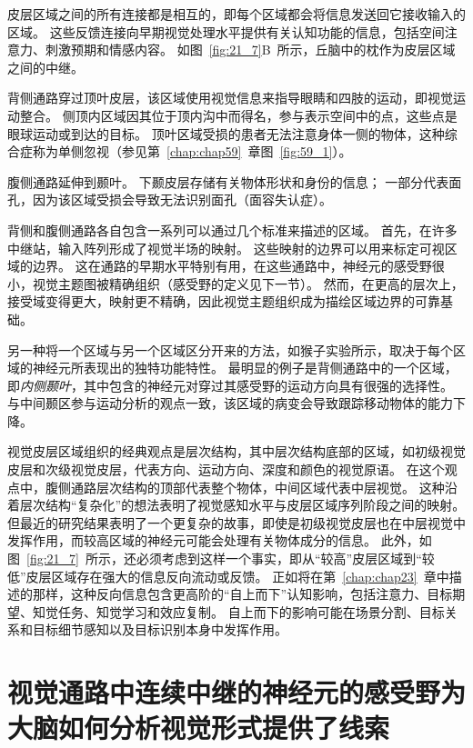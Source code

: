皮层区域之间的所有连接都是相互的，即每个区域都会将信息发送回它接收输入的区域。
这些反馈连接向早期视觉处理水平提供有关认知功能的信息，包括空间注意力、刺激预期和情感内容。
如图~\ref{fig:21_7}B~所示，丘脑中的枕作为皮层区域之间的中继。


背侧通路穿过顶叶皮层，该区域使用视觉信息来指导眼睛和四肢的运动，即视觉运动整合。
侧顶内区域因其位于顶内沟中而得名，参与表示空间中的点，这些点是眼球运动或到达的目标。
顶叶区域受损的患者无法注意身体一侧的物体，这种综合症称为单侧忽视（参见第~\ref{chap:chap59}~章图~\ref{fig:59_1}）。


腹侧通路延伸到颞叶。
下颞皮层存储有关物体形状和身份的信息；
一部分代表面孔，因为该区域受损会导致无法识别面孔（面容失认症）。


背侧和腹侧通路各自包含一系列可以通过几个标准来描述的区域。
首先，在许多中继站，输入阵列形成了视觉半场的映射。
这些映射的边界可以用来标定可视区域的边界。
这在通路的早期水平特别有用，在这些通路中，神经元的感受野很小，视觉主题图被精确组织（感受野的定义见下一节）。
然而，在更高的层次上，接受域变得更大，映射更不精确，因此视觉主题组织成为描绘区域边界的可靠基础。


另一种将一个区域与另一个区域区分开来的方法，如猴子实验所示，取决于每个区域的神经元所表现出的独特功能特性。
最明显的例子是背侧通路中的一个区域，即\textit{内侧颞叶}，其中包含的神经元对穿过其感受野的运动方向具有很强的选择性。
与中间颞区参与运动分析的观点一致，该区域的病变会导致跟踪移动物体的能力下降。


视觉皮层区域组织的经典观点是层次结构，其中层次结构底部的区域，如初级视觉皮层和次级视觉皮层，代表方向、运动方向、深度和颜色的视觉原语。
在这个观点中，腹侧通路层次结构的顶部代表整个物体，中间区域代表中层视觉。
这种沿着层次结构“复杂化”的想法表明了视觉感知水平与皮层区域序列阶段之间的映射。
但最近的研究结果表明了一个更复杂的故事，即使是初级视觉皮层也在中层视觉中发挥作用，而较高区域的神经元可能会处理有关物体成分的信息。
此外，如图~\ref{fig:21_7}~所示，还必须考虑到这样一个事实，即从“较高”皮层区域到“较低”皮层区域存在强大的信息反向流动或反馈。
正如将在第~\ref{chap:chap23}~章中描述的那样，这种反向信息包含更高阶的“自上而下”认知影响，包括注意力、目标期望、知觉任务、知觉学习和效应复制。
自上而下的影响可能在场景分割、目标关系和目标细节感知以及目标识别本身中发挥作用。



\section{视觉通路中连续中继的神经元的感受野为大脑如何分析视觉形式提供了线索}

